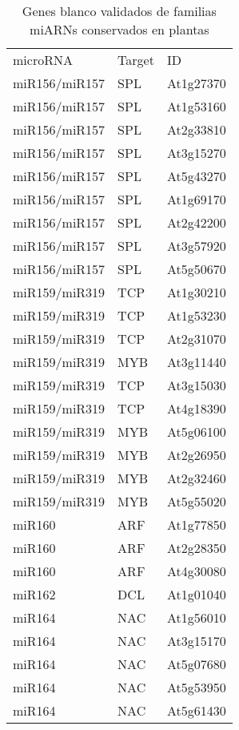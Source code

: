 \begin{table}[htbp!]
\tiny
\centering
\caption{Genes blanco validados de familias miARNs conservados en plantas}
\label{table:NAR_table_S3}
\begin{tabular}{lll}
microRNA      & Target       & ID        \\
miR156/miR157 & SPL          & At1g27370 \\
miR156/miR157 & SPL          & At1g53160 \\
miR156/miR157 & SPL          & At2g33810 \\
miR156/miR157 & SPL          & At3g15270 \\
miR156/miR157 & SPL          & At5g43270 \\
miR156/miR157 & SPL          & At1g69170 \\
miR156/miR157 & SPL          & At2g42200 \\
miR156/miR157 & SPL          & At3g57920 \\
miR156/miR157 & SPL          & At5g50670 \\
miR159/miR319 & TCP          & At1g30210 \\
miR159/miR319 & TCP          & At1g53230 \\
miR159/miR319 & TCP          & At2g31070 \\
miR159/miR319 & MYB          & At3g11440 \\
miR159/miR319 & TCP          & At3g15030 \\
miR159/miR319 & TCP          & At4g18390 \\
miR159/miR319 & MYB          & At5g06100 \\
miR159/miR319 & MYB          & At2g26950 \\
miR159/miR319 & MYB          & At2g32460 \\
miR159/miR319 & MYB          & At5g55020 \\
miR160        & ARF          & At1g77850 \\
miR160        & ARF          & At2g28350 \\
miR160        & ARF          & At4g30080 \\
miR162        & DCL          & At1g01040 \\
miR164        & NAC          & At1g56010 \\
miR164        & NAC          & At3g15170 \\
miR164        & NAC          & At5g07680 \\
miR164        & NAC          & At5g53950 \\
miR164        & NAC          & At5g61430 \\

\end{tabular}
\end{table}
